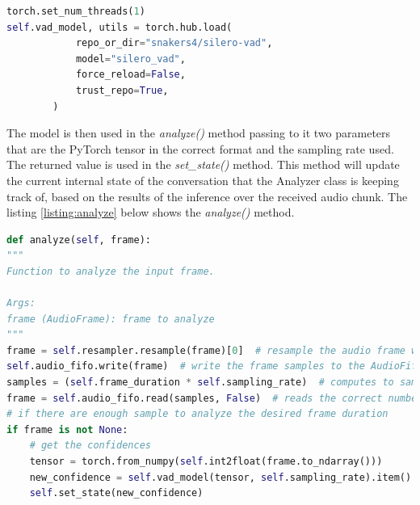 \documentclass[../main.tex]{subfiles}
\begin{document}
\begin{lstlisting}[language=Python, caption=Silero VAD model load]
torch.set_num_threads(1)
self.vad_model, utils = torch.hub.load(
            repo_or_dir="snakers4/silero-vad",
            model="silero_vad",
            force_reload=False,
            trust_repo=True,
        )
\end{lstlisting}
\label{listing:model load}

The model is then used in the \textit{analyze()} method passing to it two parameters that are the PyTorch tensor in the correct format and the sampling rate used. The returned value is used in the \textit{set\_state()} method. This method will update the current internal state of the conversation that the Analyzer class is keeping track of, based on the results of the inference over the received audio chunk. The listing \ref{listing:analyze} below shows the \textit{analyze()} method.

\begin{lstlisting}[language=Python, caption={analyze() method}]
def analyze(self, frame):
"""
Function to analyze the input frame.

Args:
frame (AudioFrame): frame to analyze
"""
frame = self.resampler.resample(frame)[0]  # resample the audio frame with the selected sampling_rate
self.audio_fifo.write(frame)  # write the frame samples to the AudioFifo
samples = (self.frame_duration * self.sampling_rate)  # computes to samples to read needed for the specified frame duration
frame = self.audio_fifo.read(samples, False)  # reads the correct number of samples from the fifo
# if there are enough sample to analyze the desired frame duration
if frame is not None:
    # get the confidences
    tensor = torch.from_numpy(self.int2float(frame.to_ndarray())) 
    new_confidence = self.vad_model(tensor, self.sampling_rate).item()
    self.set_state(new_confidence)
\end{lstlisting}
\label{listing:analyze}
\end{document}
